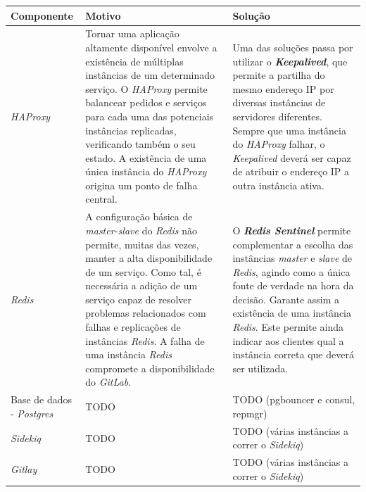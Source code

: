 \documentclass[12pt,a4paper]{article}
\begin{document}
\begin{table}[ht]
    \centering
    \begin{adjustbox}{width=1\textwidth}
    \small
    \begin{tabular}{ | p{5cm} | p{6cm} | p{6cm} |}
        \hline
        \textbf{Componente} & \textbf{Motivo} & \textbf{Solução} \\ \hline
       
        \textit{HAProxy} & Tornar uma aplicação altamente disponível envolve a existência de múltiplas instâncias de um determinado serviço. O \emph{HAProxy} permite balancear pedidos e serviços para cada uma das potenciais instâncias replicadas, verificando também o  seu estado. A existência de uma única instância do \emph{HAProxy} origina um ponto de falha central. & Uma das soluções passa por utilizar o \textbf{\textit{Keepalived}}, que permite a partilha do mesmo endereço IP por diversas instâncias de servidores diferentes. Sempre que uma instância do \emph{HAProxy} falhar, o \textit{Keepalived} deverá ser capaz de atribuir o endereço IP a outra instância ativa.  \\ \hline
        
        \emph{Redis} & A configuração básica de \emph{master-slave} do \emph{Redis} não permite, muitas das vezes, manter a alta disponibilidade de um serviço. Como tal, é necessária a adição de um serviço capaz de resolver problemas relacionados com falhas e replicações de instâncias \emph{Redis}. A falha de uma instância \emph{Redis} compromete a disponibilidade do \emph{GitLab}. & O \textbf{\emph{Redis Sentinel}} permite complementar a escolha das instâncias \emph{master} e \emph{slave} de  \emph{Redis}, agindo como a única fonte de verdade na hora da decisão. Garante assim a existência de uma instância \emph{Redis}.  Este permite ainda indicar aos clientes qual a instância correta que deverá ser utilizada.   \\ \hline
        
        Base de dados - \emph{Postgres} & TODO & TODO (pgbouncer e consul, repmgr) \\ \hline
        
        \emph{Sidekiq} & TODO & TODO (várias instâncias a correr o \emph{Sidekiq}) \\ \hline
        
        \emph{Gitlay} & TODO & TODO (várias instâncias a correr o \emph{Sidekiq}) \\ \hline
        

\end{tabular}
\end{adjustbox}
\end{table}
\end{document}
